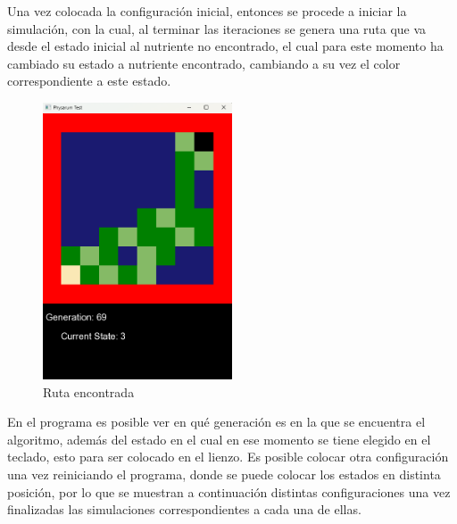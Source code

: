     \vskip 0.5cm
    Una vez colocada la configuraci\'on inicial, entonces se
        procede a iniciar la simulaci\'on, con la cual, al terminar las
        iteraciones se genera una ruta que va desde el estado inicial
        al nutriente no encontrado, el cual para este momento ha
        cambiado su estado a nutriente encontrado, cambiando a su
        vez el color correspondiente a este estado.
    \vskip 0.5cm
    \begin{figure}[htbp]
        \centering
        \includegraphics[width=0.5\textwidth]{./images/Pruebas/simulador/image003.png}
        \caption{Ruta encontrada}
        \label{fig:Ruta encontrada}
    \end{figure}
    \vskip 0.5cm
    En el programa es posible ver en qu\'e generaci\'on es en la que
        se encuentra el algoritmo, adem\'as del estado en el cual en ese
        momento se tiene elegido en el teclado, esto para ser
        colocado en el lienzo.
    \vskip 0.5cm
    Es posible colocar otra configuraci\'on una vez reiniciando el
        programa, donde se puede colocar los estados en distinta
        posici\'on, por lo que se muestran a continuaci\'on distintas
        configuraciones una vez finalizadas las simulaciones
        correspondientes a cada una de ellas.
    \vskip 0.5cm
